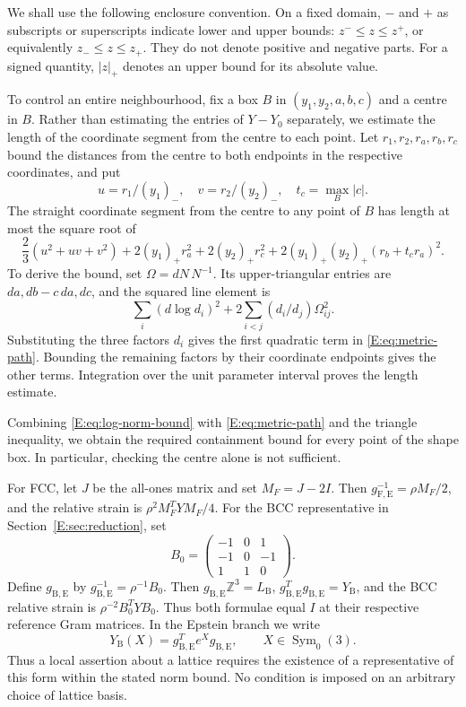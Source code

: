 \documentclass[reqno,english]{amsart}
\theoremstyle{definition}
\newtheorem{open problem}[theorem]{Open Problem}
\theoremstyle{remark}
\theoremstyle{plain}
\numberwithin{equation}{section}
\newcommand{\Z}{\mathbb Z}
\newcommand{\B}{L_{\mathrm B}}
\newcommand{\BCC}{\B}
\newcommand{\YB}{Y_{\mathrm B}}
\newcommand{\gFE}{g_{\mathrm F,\mathrm E}}
\newcommand{\Symzero}{\operatorname{Sym}_0(3)}
\newcommand{\gBE}{g_{\mathrm B,\mathrm E}}
\begin{document}
We shall use the following enclosure convention. On a fixed domain,
$-$ and $+$ as subscripts or superscripts indicate lower and upper
bounds: $z^-\le z\le z^+$, or equivalently $z_-\le z\le z_+$.
They do not denote positive and negative parts. For a signed quantity,
$|z|_+$ denotes an upper bound for its absolute value.

To control an entire neighbourhood, fix a box $B$ in
$(y_1,y_2,a,b,c)$ and a centre in $B$. Rather than estimating the
entries of $Y-Y_0$ separately, we estimate the length of the coordinate
segment from the centre to each point. Let $r_1,r_2,r_a,r_b,r_c$
bound the distances from the centre to both endpoints in the respective
coordinates, and put
\[
 u=r_1/(y_1)_-,\quad v=r_2/(y_2)_-,\quad t_c=\max_B|c|.
\]
The straight coordinate segment from the centre to any point of $B$ has length at most the square root of
\begin{equation}
 \frac23(u^2+uv+v^2)
 +2(y_1)_+r_a^2+2(y_2)_+r_c^2
 +2(y_1)_+(y_2)_+(r_b+t_cr_a)^2.
 \label{E:eq:metric-path}
\end{equation}
To derive the bound, set $\Omega=dN\,N^{-1}$. Its upper-triangular
entries are $da,db-c\,da,dc$, and the squared line element is
\[
 \sum_i(d\log d_i)^2+2\sum_{i<j}(d_i/d_j)\Omega_{ij}^2.
\]
Substituting the three factors $d_i$ gives the first quadratic term in
\eqref{E:eq:metric-path}. Bounding the remaining factors by their
coordinate endpoints gives the other terms. Integration over the unit
parameter interval proves the length estimate.

Combining \eqref{E:eq:log-norm-bound} with \eqref{E:eq:metric-path}
and the triangle inequality, we obtain the required containment bound
for every point of the shape box. In particular, checking the centre
alone is not sufficient.

For FCC, let $J$ be the all-ones matrix and set $M_F=J-2I$.
Then $\gFE^{-1}=\rho M_F/2$, and the relative strain is
$\rho^2M_F^TYM_F/4$. For the BCC representative in Section~\ref{E:sec:reduction}, set
\[
 B_0=\begin{pmatrix}-1&0&1\\-1&0&-1\\1&1&0\end{pmatrix}.
\]
Define $\gBE$ by $\gBE^{-1}=\rho^{-1}B_0$. Then
$\gBE\Z^3=\BCC$, $\gBE^T\gBE=\YB$, and the BCC relative strain is
$\rho^{-2}B_0^TYB_0$. Thus both formulae equal $I$ at their respective
reference Gram matrices. In the Epstein branch we write
\[
 Y_{\mathrm B}(X)=\gBE^Te^X\gBE,\qquad X\in\Symzero.
\]
Thus a local assertion about a lattice requires the existence of a
representative of this form within the stated norm bound. No condition
is imposed on an arbitrary choice of lattice basis.
\end{document}
